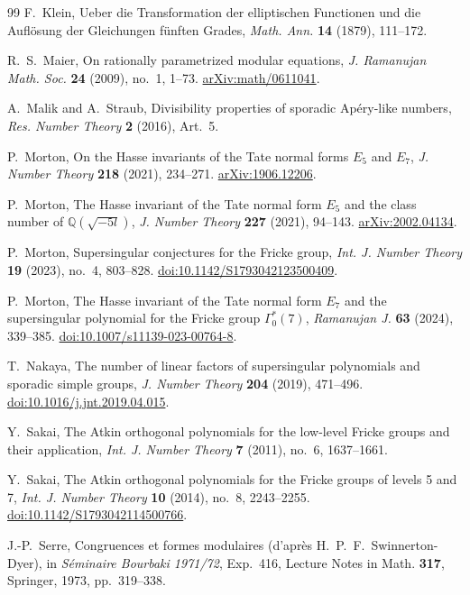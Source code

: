 \documentclass[11pt,a4paper]{article}
\theoremstyle{definition}
\theoremstyle{remark}
\newcommand{\Q}{\mathbb{Q}}
\numberwithin{equation}{section}
\begin{document}
\begin{thebibliography}{99}
F.~Klein, Ueber die Transformation der elliptischen Functionen und die
Aufl\"osung der Gleichungen f\"unften Grades, \emph{Math. Ann.} \textbf{14}
(1879), 111--172.

R.~S.~Maier, On rationally parametrized modular equations,
\emph{J. Ramanujan Math. Soc.} \textbf{24} (2009), no.~1, 1--73.
\href{https://arxiv.org/abs/math/0611041}{arXiv:math/0611041}.

A.~Malik and A.~Straub, Divisibility properties of sporadic Ap\'ery-like
numbers, \emph{Res. Number Theory} \textbf{2} (2016), Art.~5.

P.~Morton, On the Hasse invariants of the Tate normal forms $E_5$ and $E_7$,
\emph{J. Number Theory} \textbf{218} (2021), 234--271.
\href{https://arxiv.org/abs/1906.12206}{arXiv:1906.12206}.

P.~Morton, The Hasse invariant of the Tate normal form $E_5$ and the class
number of $\Q(\sqrt{-5l})$, \emph{J. Number Theory} \textbf{227} (2021),
94--143. \href{https://arxiv.org/abs/2002.04134}{arXiv:2002.04134}.

P.~Morton, Supersingular conjectures for the Fricke group,
\emph{Int. J. Number Theory} \textbf{19} (2023), no.~4, 803--828.
\href{https://doi.org/10.1142/S1793042123500409}{doi:10.1142/S1793042123500409}.

P.~Morton, The Hasse invariant of the Tate normal form $E_7$ and the
supersingular polynomial for the Fricke group $\Gamma_0^*(7)$,
\emph{Ramanujan J.} \textbf{63} (2024), 339--385.
\href{https://doi.org/10.1007/s11139-023-00764-8}{doi:10.1007/s11139-023-00764-8}.

T.~Nakaya, The number of linear factors of supersingular polynomials and
sporadic simple groups, \emph{J. Number Theory} \textbf{204} (2019), 471--496.
\href{https://doi.org/10.1016/j.jnt.2019.04.015}{doi:10.1016/j.jnt.2019.04.015}.

Y.~Sakai, The Atkin orthogonal polynomials for the low-level Fricke groups
and their application, \emph{Int. J. Number Theory} \textbf{7} (2011), no.~6,
1637--1661.

Y.~Sakai, The Atkin orthogonal polynomials for the Fricke groups of levels
5 and 7, \emph{Int. J. Number Theory} \textbf{10} (2014), no.~8, 2243--2255.
\href{https://doi.org/10.1142/S1793042114500766}{doi:10.1142/S1793042114500766}.

J.-P.~Serre, Congruences et formes modulaires (d'apr\`es
H.~P.~F.~Swinnerton-Dyer), in \emph{S\'eminaire Bourbaki 1971/72}, Exp.~416,
Lecture Notes in Math. \textbf{317}, Springer, 1973, pp.~319--338.


\end{thebibliography}
\end{document}
